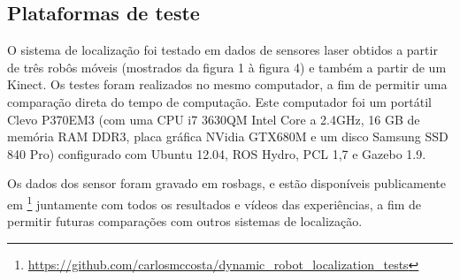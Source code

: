 \documentclass[9pt,a4paper]{extarticle}
\begin{document}
\begin{multicols}{2}
\section{Plataformas de teste}

O sistema de localização foi testado em dados de sensores laser obtidos a partir de três robôs móveis (mostrados da figura 1 à figura 4) e também a partir de um Kinect. Os testes foram realizados no mesmo computador, a fim de permitir uma comparação direta do tempo de computação. Este computador foi um portátil Clevo P370EM3 (com uma CPU i7 3630QM Intel Core a 2.4GHz, 16 GB de memória RAM DDR3, placa gráfica NVidia GTX680M e um disco Samsung SSD 840 Pro) configurado com Ubuntu 12.04, ROS Hydro, PCL 1,7 e Gazebo 1.9.

Os dados dos sensor foram gravado em rosbags, e estão disponíveis publicamente em \footnote{\url{https://github.com/carlosmccosta/dynamic_robot_localization_tests}} juntamente com todos os resultados e vídeos das experiências, a fim de permitir futuras comparações com outros sistemas de localização.


\end{multicols}
\end{document}
